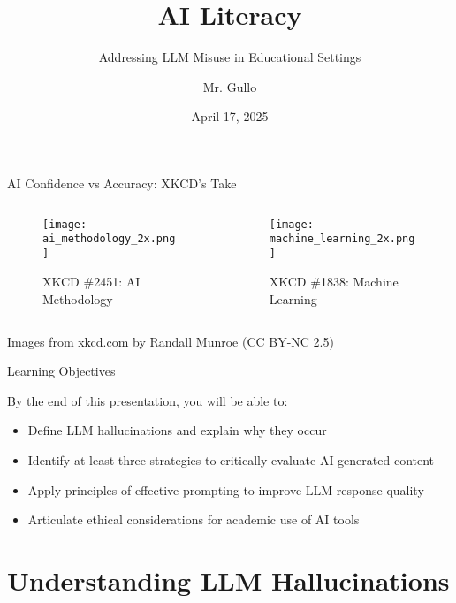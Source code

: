 \documentclass{beamer}
\title[Critical AI Literacy]{AI Literacy}
\subtitle{Addressing LLM Misuse in Educational Settings}
\author[Mr. Gullo]{Mr. Gullo}
\date[April 2025]{April 17, 2025}
\begin{document}
\begin{frame}
\titlepage
\end{frame}

\begin{frame}{AI Confidence vs Accuracy: XKCD's Take}
  \begin{columns}
    \begin{column}{0.48\textwidth}
     \begin{figure}
         \centering
         \texttt{[image: ai\_methodology\_2x.png]}
     
      \caption*{XKCD \#2451: AI Methodology}
      \end{figure}
    \end{column}
    \begin{column}{0.48\textwidth}
      \begin{figure}
          \centering
          \texttt{[image: machine\_learning\_2x.png]}
                \caption*{XKCD \#1838: Machine Learning}
      \end{figure}

    \end{column}
  \end{columns}
  \vspace{0.5cm}
  \tiny{Images from xkcd.com by Randall Munroe (CC BY-NC 2.5)}
\end{frame}

\begin{frame}{Learning Objectives}
\begin{block}{By the end of this presentation, you will be able to:}
\begin{itemize}
  \item Define LLM hallucinations and explain why they occur
  \item Identify at least three strategies to critically evaluate AI-generated content
  \item Apply principles of effective prompting to improve LLM response quality
  \item Articulate ethical considerations for academic use of AI tools
\end{itemize}
\end{block}
\end{frame}

\section{Understanding LLM Hallucinations}
\end{document}
